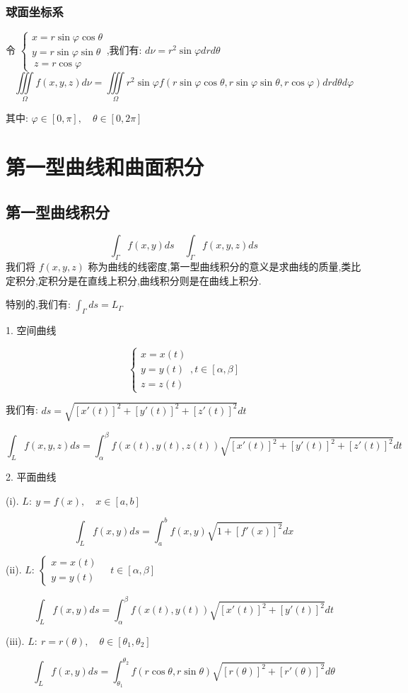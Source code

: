 \subsection{球面坐标系}
\begin{definition}[球面坐标替换]
	令 $\left\lbrace \begin{array}{l}
		x=r\sin\varphi\cos\theta\\
		y=r\sin\varphi\sin\theta \\\
		z=r\cos\varphi
	\end{array}\right. $,我们有: $d\nu=r^2\sin\varphi drd\theta$
	$$\iiint\limits_{\Omega}f(x,y,z)d\nu=\iiint\limits_{\Omega}r^2\sin\varphi f(r\sin\varphi\cos\theta,r\sin\varphi\sin\theta,r\cos\varphi) drd\theta d\varphi$$
	
	其中: $\varphi\in[0,\pi],\quad \theta\in[0,2\pi]$
\end{definition}
\chapter{第一型曲线和曲面积分}
\section{第一型曲线积分}
\begin{definition}[第一型曲线积分]
	$$\int_{\Gamma}f(x,y)ds\quad \int_{\Gamma}f(x,y,z)ds$$
	我们将 $f(x,y,z)$ 称为曲线的线密度,第一型曲线积分的意义是求曲线的质量,类比定积分,定积分是在直线上积分,曲线积分则是在曲线上积分.
	
	特别的,我们有: $\int_{\Gamma}ds=L_{\Gamma}$
\end{definition}
\begin{theorem}[曲线积分的求解]
	
	1. 空间曲线
	
	$$\left\lbrace \begin{array}{l}
		x=x(t)\\
		y=y(t)\\
		z=z(t)
	\end{array}\right. ,t\in[\alpha,\beta]$$
	
	我们有: $ds=\sqrt{[x'(t)]^{2}+[y'(t)]^{2}+[z'(t)]^{2}}dt$
	
	$$\int_{L}f(x,y,z)ds=\int_{\alpha}^{\beta}f(x(t),y(t),z(t))\sqrt{[x'(t)]^{2}+[y'(t)]^{2}+[z'(t)]^{2}}dt$$
	
	2. 平面曲线
	
	(i). $L:\ y=f(x),\quad x\in[a,b]$
	
	$$\int_{L}f(x,y)ds=\int_{a}^{b}f(x,y)\sqrt{1+[f'(x)]^2}dx$$
	
	(ii). $L:\ \left\lbrace \begin{array}{l}
		x=x(t)\\
		y=y(t)
	\end{array}\right.\quad t\in[\alpha,\beta]$
	
	$$\int_{L}f(x,y)ds=\int_{\alpha}^{\beta}f(x(t),y(t))\sqrt{[x'(t)]^2+[y'(t)]^2}dt$$
	
	(iii). $L:\ r=r(\theta),\quad \theta\in[\theta_{1},\theta_{2}]$
	
	$$\int_{L}f(x,y)ds=\int_{\theta_{1}}^{\theta_{2}}f(r\cos \theta,r\sin\theta)\sqrt{[r(\theta)]^2+[r'(\theta)]^2}d\theta$$
\end{theorem}

